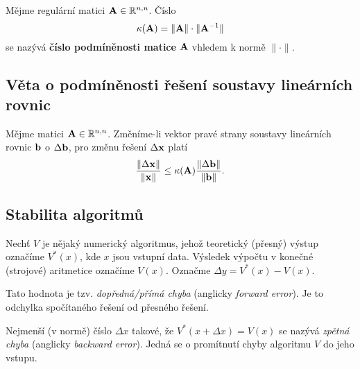 Mějme regulární matici $\mathbf{A} \in \mathbb{R}^{n,n}$. Číslo
\[ \kappa(\mathbf{A}) = \|\mathbf{A}\| \cdot \| \mathbf{A}^{-1} \| \]
se nazývá \textbf{číslo podmíněnosti matice} $\mathbf{A}$ vhledem k normě $\|\cdot\|$.

\subsection*{Věta o podmíněnosti řešení soustavy lineárních rovnic}

Mějme matici $\mathbf{A} \in \mathbb{R}^{n,n}$. Změníme-li vektor pravé strany soustavy lineárních rovnic $\mathbf{b}$ o $\Delta \mathbf{b}$, pro změnu řešení $\Delta \mathbf{x}$ platí
\[ \frac{\| \Delta \mathbf{x} \|}{\| \mathbf{x} \|} \leq \kappa(\mathbf{A}) \frac{\| \Delta \mathbf{b} \|}{\| \mathbf{b} \|}. \]

\subsection*{Stabilita algoritmů}

Nechť $V$ je nějaký numerický algoritmus, jehož teoretický (přesný) výstup označíme $V^*(x)$, kde $x$ jsou vstupní data. Výsledek výpočtu v konečné (strojové) aritmetice označíme $V(x)$.
Označme $\Delta y = V^*(x) - V(x)$.

Tato hodnota je tzv. \emph{dopředná/přímá chyba} (anglicky \emph{forward error}). Je to odchylka spočítaného řešení od přesného řešení.

Nejmenší (v normě) číslo $\Delta x$ takové, že $V^*(x + \Delta x) = V(x)$ se nazývá \emph{zpětná chyba} (anglicky \emph{backward error}). Jedná se o promítnutí chyby algoritmu $V$ do jeho vstupu.

\pagebreak